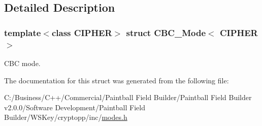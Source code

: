\subsection{Detailed Description}
\subsubsection*{template$<$class CIPHER$>$ struct CBC\_\-Mode$<$ CIPHER $>$}

CBC mode. 

The documentation for this struct was generated from the following file:\begin{DoxyCompactItemize}
\item 
C:/Business/C++/Commercial/Paintball Field Builder/Paintball Field Builder v2.0.0/Software Development/Paintball Field Builder/WSKey/cryptopp/inc/\hyperlink{modes_8h}{modes.h}\end{DoxyCompactItemize}
